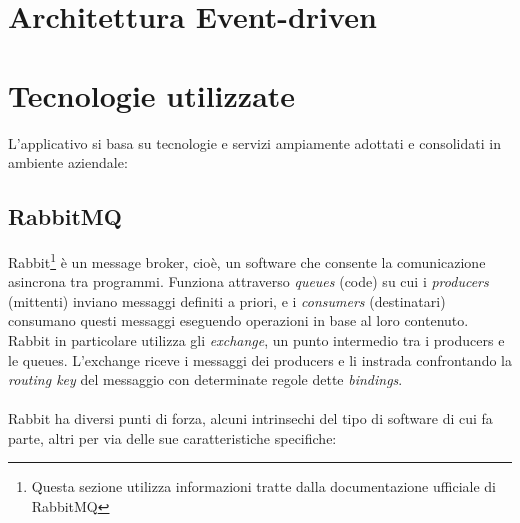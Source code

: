 \section{Architettura Event-driven}

\section{Tecnologie utilizzate}

L'applicativo si basa su tecnologie e servizi ampiamente adottati e consolidati in ambiente aziendale:

\subsection{RabbitMQ}
Rabbit\footnote{Questa sezione utilizza informazioni tratte dalla documentazione ufficiale di RabbitMQ\cite{rabbitmq}}
\`e un message broker, cio\`e, un software che consente la comunicazione asincrona tra programmi.
Funziona attraverso \textit{queues} (code) su cui i \textit{producers} (mittenti) inviano messaggi definiti a priori,
e i \textit{consumers} (destinatari) consumano questi messaggi eseguendo operazioni in base al loro contenuto.
Rabbit in particolare utilizza gli \textit{exchange}, un punto intermedio tra i producers e le queues.
L'exchange riceve i messaggi dei producers e li instrada confrontando la \textit{routing key} del messaggio con determinate regole dette \textit{bindings}.
\\\\
Rabbit ha diversi punti di forza, alcuni intrinsechi del tipo di software di cui fa parte, altri per via delle sue caratteristiche specifiche:\
